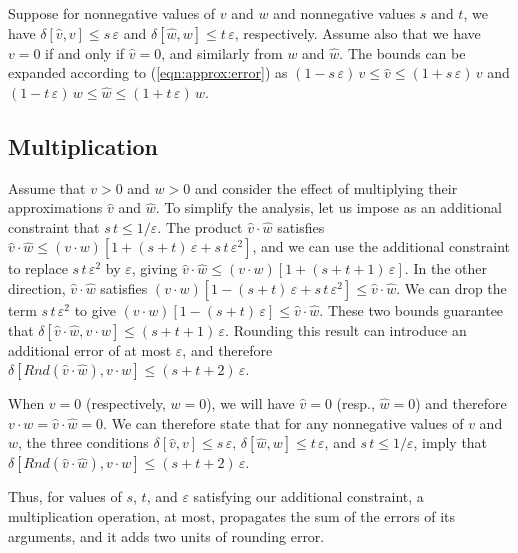 \documentclass[
hf
]{ceurart}
\newcommand{\approximate}[1]{\hat{#1}}
\newcommand{\approxv}{\approximate{v}}
\newcommand{\approxw}{\approximate{w}}
\newcommand{\round}{\mathit{Rnd}}
\newcommand{\aerror}{\delta}
\newcommand{\roundepsilon}{\varepsilon}
\begin{document}
Suppose for nonnegative values of $v$ and $w$ and nonnegative values $s$ and $t$, we have
$\aerror[\approxv, v] \leq s\, \roundepsilon$ and
$\aerror[\approxw, w] \leq t\, \roundepsilon$, respectively.  Assume also that we have $v = 0$ if and only if $\approxv = 0$, and similarly from $w$ and $\approxw$.
The bounds can be expanded according to (\ref{eqn:approx:error}) as
$(1-s\,\roundepsilon)\, v \leq \approxv \leq (1+s\,\roundepsilon)\, v$ and
$(1-t\,\roundepsilon)\, w \leq \approxw \leq (1+t\,\roundepsilon)\, w$.


\subsection{Multiplication}

Assume that $v > 0$ and $w > 0$ and consider the effect of multiplying their approximations
$\approxv$ and $\approxw$.  To simplify the analysis, let us impose as an additional constraint that $s\,t \leq 1/\roundepsilon$.
The product $\approxv \cdot \approxw$  satisfies
$\approxv \cdot \approxw \leq (v\cdot w) [1 + (s+t)\,\roundepsilon + s\,t\,\roundepsilon^2]$, and we can use the additional constraint to replace $s\,t\,\roundepsilon^2$ by $\roundepsilon$,
giving
$\approxv \cdot \approxw \leq (v\cdot w) [1 + (s+t+1)\,\roundepsilon]$.
In the other direction, $\approxv \cdot \approxw$ satisfies
$(v\cdot w) [1 - (s+t)\,\roundepsilon + s\,t\,\roundepsilon^2] \leq \approxv \cdot \approxw$.  We can drop the term
$s\,t\,\roundepsilon^2$ to give
$(v\cdot w) [1 - (s+t)\,\roundepsilon] \leq \approxv \cdot \approxw$.  These two bounds guarantee that
$\aerror[\approxv \cdot \approxw, v \cdot w] \leq (s+t+1)\,\roundepsilon$.
Rounding this result can introduce an additional error of at most $\roundepsilon$, and therefore
$\aerror[\round(\approxv \cdot \approxw), v \cdot w] \leq (s+t+2)\,\roundepsilon$.

When $v=0$ (respectively, $w=0$), we will have $\approxv=0$ (resp., $\approxw = 0$) and therefore $v \cdot w = \approxv \cdot \approxw = 0$.
We can therefore state that  for any nonnegative values of $v$ and $w$, the three conditions $\aerror[\approxv, v] \leq s\,\roundepsilon$,
$\aerror[\approxw, w] \leq t\,\roundepsilon$, and
$s\,t \leq 1/\roundepsilon$, imply that
$\aerror[\round(\approxv \cdot \approxw), v \cdot w] \leq (s+t+2)\,\roundepsilon$.

Thus, for values of $s$, $t$, and $\roundepsilon$ satisfying our
additional constraint, a multiplication operation, at most, propagates
the sum of the errors of its arguments, and it adds two units of
rounding error.
\end{document}
